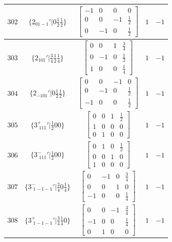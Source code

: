 \documentclass[fleqn,8pt]{jsarticle}
\begin{document}
\begin{longtable}{ccccc}
$ 302 $ & $ \{2{}_{01-1}{}'|0 \frac{1}{2} \frac{1}{2}\} $ & $ \begin{bmatrix} -1 & 0 & 0 & 0 \\ 0 & 0 & -1 & \frac{1}{2} \\ 0 & -1 & 0 & \frac{1}{2} \end{bmatrix} $ & $ 1 $ & $ -1 $ \\ \hline
$ 303 $ & $ \{2{}_{101}{}'|\frac{3}{4} \frac{1}{2} \frac{1}{4}\} $ & $ \begin{bmatrix} 0 & 0 & 1 & \frac{3}{4} \\ 0 & -1 & 0 & \frac{1}{2} \\ 1 & 0 & 0 & \frac{1}{4} \end{bmatrix} $ & $ 1 $ & $ -1 $ \\ \hline
$ 304 $ & $ \{2{}_{-101}{}'|0 \frac{1}{2} \frac{1}{2}\} $ & $ \begin{bmatrix} 0 & 0 & -1 & 0 \\ 0 & -1 & 0 & \frac{1}{2} \\ -1 & 0 & 0 & \frac{1}{2} \end{bmatrix} $ & $ 1 $ & $ -1 $ \\ \hline
$ 305 $ & $ \{3^{+}_{\,\,111}{}'|\frac{1}{2} 0 0\} $ & $ \begin{bmatrix} 0 & 0 & 1 & \frac{1}{2} \\ 1 & 0 & 0 & 0 \\ 0 & 1 & 0 & 0 \end{bmatrix} $ & $ 1 $ & $ -1 $ \\ \hline
$ 306 $ & $ \{3^{-}_{\,\,111}{}'|\frac{1}{2} 0 0\} $ & $ \begin{bmatrix} 0 & 1 & 0 & \frac{1}{2} \\ 0 & 0 & 1 & 0 \\ 1 & 0 & 0 & 0 \end{bmatrix} $ & $ 1 $ & $ -1 $ \\ \hline
$ 307 $ & $ \{3^{-}_{\,\,1-1-1}{}'|\frac{3}{4} 0 \frac{1}{4}\} $ & $ \begin{bmatrix} 0 & -1 & 0 & \frac{3}{4} \\ 0 & 0 & 1 & 0 \\ -1 & 0 & 0 & \frac{1}{4} \end{bmatrix} $ & $ 1 $ & $ -1 $ \\ \hline
$ 308 $ & $ \{3^{+}_{\,\,1-1-1}{}'|\frac{3}{4} \frac{1}{4} 0\} $ & $ \begin{bmatrix} 0 & 0 & -1 & \frac{3}{4} \\ -1 & 0 & 0 & \frac{1}{4} \\ 0 & 1 & 0 & 0 \end{bmatrix} $ & $ 1 $ & $ -1 $ \\ \hline

\end{longtable}
\end{document}
